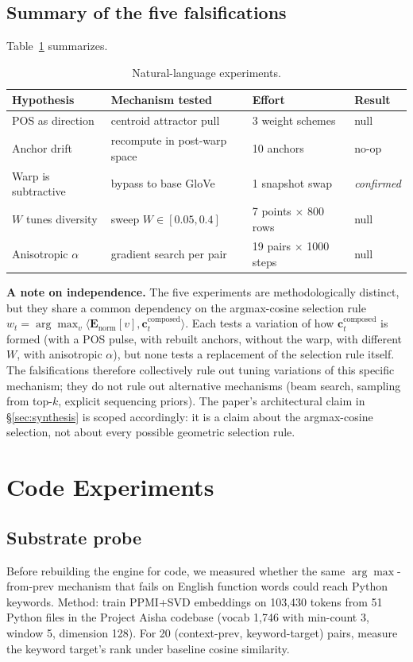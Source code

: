 \documentclass[11pt,a4paper]{article}
\begin{document}
\subsection{Summary of the five falsifications}
Table~\ref{tab:nl_falsifications} summarizes.
\begin{table}[h]
\centering
\begin{tabular}{llll}
\toprule
\textbf{Hypothesis} & \textbf{Mechanism tested} & \textbf{Effort} & \textbf{Result} \\
\midrule
POS as direction & centroid attractor pull & 3 weight schemes & null \\
Anchor drift & recompute in post-warp space & 10 anchors & no-op \\
Warp is subtractive & bypass to base GloVe & 1 snapshot swap & \emph{confirmed} \\
$W$ tunes diversity & sweep $W \in [0.05, 0.4]$ & 7 points $\times$ 800 rows & null \\
Anisotropic $\alpha$ & gradient search per pair & 19 pairs $\times$ 1000 steps & null \\
\bottomrule
\end{tabular}
\caption{Natural-language experiments.}\label{tab:nl_falsifications}
\end{table}

\textbf{A note on independence.} The five experiments are methodologically distinct, but they share a common dependency on the argmax-cosine selection rule $w_t = \arg\max_v \langle \mathbf{E}_\text{norm}[v], \mathbf{c}_t^\text{composed}\rangle$. Each tests a variation of how $\mathbf{c}_t^\text{composed}$ is formed (with a POS pulse, with rebuilt anchors, without the warp, with different $W$, with anisotropic $\alpha$), but none tests a replacement of the selection rule itself. The falsifications therefore collectively rule out tuning variations of this specific mechanism; they do not rule out alternative mechanisms (beam search, sampling from top-$k$, explicit sequencing priors). The paper's architectural claim in §\ref{sec:synthesis} is scoped accordingly: it is a claim about the argmax-cosine selection, not about every possible geometric selection rule.

\section{Code Experiments}\label{sec:code}

\subsection{Substrate probe}
Before rebuilding the engine for code, we measured whether the same $\arg\max$-from-prev mechanism that fails on English function words could reach Python keywords. Method: train PPMI+SVD embeddings on 103{,}430 tokens from 51 Python files in the Project Aisha codebase (vocab 1{,}746 with min-count 3, window 5, dimension 128). For 20 (context-prev, keyword-target) pairs, measure the keyword target's rank under baseline cosine similarity.
\end{document}
